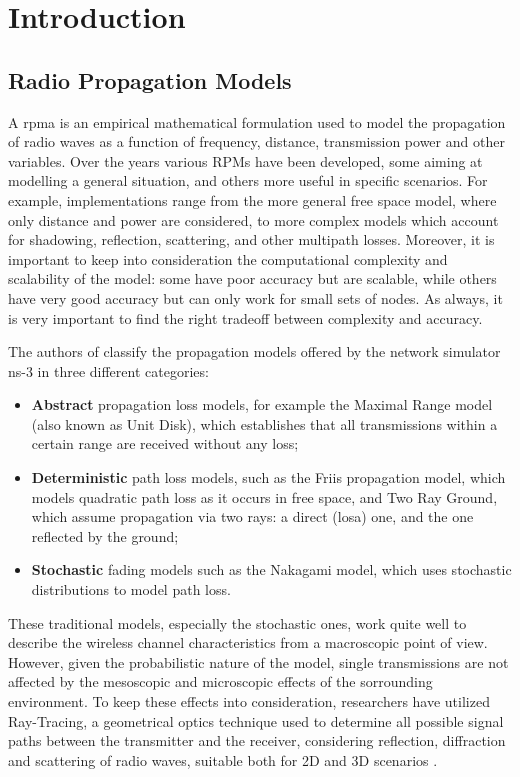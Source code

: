 
\chapter{Introduction}

	\section{Radio Propagation Models}
		A \gls{rpma} is an empirical mathematical formulation used to model the propagation of radio waves as a function of frequency, distance, transmission power and other variables. Over the years various RPMs have been developed, some aiming at modelling a general situation, and others more useful in specific scenarios. For example, implementations range from the more general free space model, where only distance and power are considered, to more complex models which account for shadowing, reflection, scattering, and other multipath losses. Moreover, it is important to keep into consideration the computational complexity and scalability of the model: some have poor accuracy but are scalable, while others have very good accuracy but can only work for small sets of nodes. As always, it is very important to find the right tradeoff between complexity and accuracy.
		
		
		The authors of \cite{6298165} classify the propagation models offered by the network simulator ns-3 in three different categories:
		\begin{itemize}
			\item \textbf{Abstract} propagation loss models, for example the Maximal Range model (also known as Unit Disk), which establishes that all transmissions within a certain range are received without any loss;
			\item \textbf{Deterministic} path loss models, such as the Friis propagation model, which models quadratic path loss as it occurs in free space, and Two Ray Ground, which assume propagation via two rays: a direct (\acrshort{losa}) one, and the one reflected by the ground;
			\item \textbf{Stochastic} fading models such as the Nakagami model, which uses stochastic distributions to model path loss.
		\end{itemize}
	
	
		These traditional models, especially the stochastic ones, work quite well to describe the wireless channel characteristics from a macroscopic point of view. However, given the probabilistic nature of the model, single transmissions are not affected by the mesoscopic and microscopic effects of the sorrounding environment. To keep these effects into consideration, researchers have utilized Ray-Tracing, a geometrical optics technique used to determine all possible signal paths between the transmitter and the receiver, considering reflection, diffraction and scattering of radio waves, suitable both for 2D and 3D scenarios \cite{245274} \cite{765022}.
		
